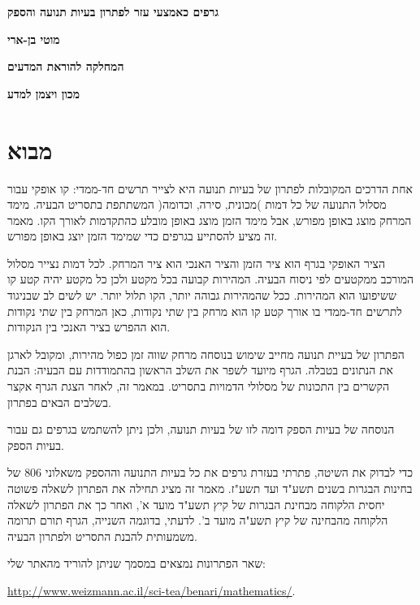 \documentclass[12pt,a4paper]{article}
\begin{document}
\thispagestyle{empty}

\begin{center}
\textbf{\LARGE גרפים כאמצעי עזר לפתרון בעיות תנועה והספק}

\bigskip
\bigskip

\textbf{\Large מוטי בן-ארי}

\bigskip

\textbf{\large המחלקה להוראת המדעים}


\textbf{\large מכון ויצמן למדע}

\end{center}

\section*{מבוא}

אחת הדרכים המקובלות לפתרון של בעיות תנועה היא לצייר תרשים חד-ממדי: קו אופקי עבור מסלול התנועה של כל דמות )מכונית, סירה, וכדומה( המשתתפת בתסריט הבעיה. מימד המרחק מוצג באופן מפורש, אבל מימד הזמן מוצג באופן מובלע כהתקדמות לאורך הקו. מאמר זה מציע להסתייע בגרפים כדי שמימד הזמן יוצג באופן מפורש.


הציר האופקי בגרף הוא ציר הזמן והציר האנכי הוא ציר המרחק. לכל דמות נצייר מסלול המורכב ממקטעים לפי ניסוח הבעיה. המהירות קבועה בכל מקטע ולכן כל מקטע יהיה קטע קו ששיפועו הוא המהירות. ככל שהמהירות גבוהה יותר, הקו תלול יותר. יש לשים לב שבניגוד לתרשים חד-ממדי בו אורך קטע קו הוא מרחק בין שתי נקודות, כאן המרחק בין שתי נקודות הוא ההפרש בציר האנכי בין הנקודות.


הפתרון של בעיית תנועה מחייב שימוש בנוסחה מרחק שווה זמן כפול מהירות, ומקובל לארגן את הנתונים בטבלה. הגרף מיועד לשפר את השלב הראשון בהתמודדות עם הבעיה: הבנת הקשרים בין התכונות של מסלולי הדמויות בתסריט. במאמר זה, לאחר הצגת הגרף אקצר בשלבים הבאים בפתרון.


הנוסחה של בעיות הספק דומה לזו של בעיות תנועה, ולכן ניתן להשתמש בגרפים גם עבור בעיות הספק.


כדי לבדוק את השיטה, פתרתי בעזרת גרפים את כל בעיות התנועה וההספק משאלוני
$806$
של בחינות הבגרות בשנים תשע"ד ועד תשע"ז. מאמר זה מציג תחילה את הפתרון לשאלה פשוטה יחסית הלקוחה מבחינת הבגרות של קיץ תשע"ד מועד א', ואחר כך את הפתרון לשאלה הלקוחה מהבחינה של קיץ תשע"ה מועד ב'. לדעתי, בדוגמה השנייה, הגרף תורם תרומה משמעותית להבנת התסריט ולפתרון הבעיה.


שאר הפתרונות נמצאים במסמך שניתן להוריד מהאתר שלי:


\url{http://www.weizmann.ac.il/sci-tea/benari/mathematics/}.
\end{document}
